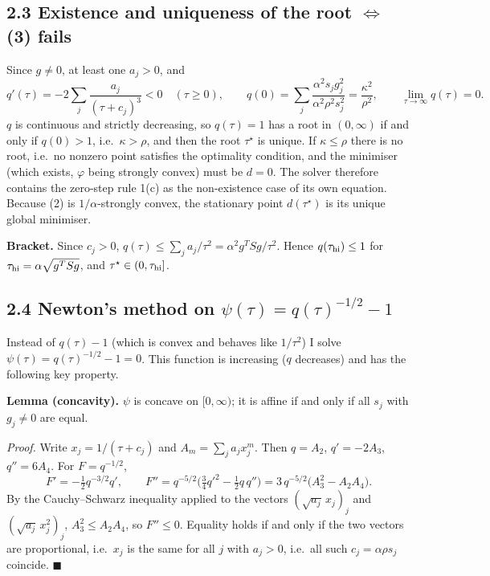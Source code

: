 \documentclass[11pt,a4paper]{article}
\begin{document}
\subsection*{2.3 Existence and uniqueness of the root $\Longleftrightarrow$ (3) fails}

Since $g\ne0$, at least one $a_j>0$, and
\begin{equation*}
q'(\tau)=-2\sum_j\frac{a_j}{(\tau+c_j)^3}<0\quad(\tau\ge0),\qquad
q(0)=\sum_j\frac{\alpha^2s_jg_j^2}{\alpha^2\rho^2s_j^2}=\frac{\kappa^2}{\rho^2},\qquad
\lim_{\tau\to\infty}q(\tau)=0 .
\end{equation*}
$q$ is continuous and strictly decreasing, so $q(\tau)=1$ has a root in $(0,\infty)$
if and only if $q(0)>1$, i.e.\ $\kappa>\rho$, and then the root $\tau^\star$ is
unique. If $\kappa\le\rho$ there is no root, i.e.\ no nonzero point satisfies the
optimality condition, and the minimiser (which exists, $\varphi$ being strongly convex)
must be $d=0$. The solver therefore contains the zero-step rule 1(c) as the
non-existence case of its own equation. Because (2) is $1/\alpha$-strongly convex,
the stationary point $d(\tau^\star)$ is its unique global minimiser.

\textbf{Bracket.} Since $c_j>0$, $q(\tau)\le\sum_ja_j/\tau^2=\alpha^2g^TSg/\tau^2$.
Hence $q(\tau_{\rm hi})\le1$ for $\tau_{\rm hi}=\alpha\sqrt{g^TSg}$, and
$\tau^\star\in(0,\tau_{\rm hi}]$.

\subsection*{2.4 Newton's method on $\psi(\tau)=q(\tau)^{-1/2}-1$}

Instead of $q(\tau)-1$ (which is convex and behaves like $1/\tau^2$) I solve
$\psi(\tau)=q(\tau)^{-1/2}-1=0$. This function is increasing ($q$ decreases) and has
the following key property.

\textbf{Lemma (concavity).} $\psi$ is concave on $[0,\infty)$; it is affine if and
only if all $s_j$ with $g_j\ne0$ are equal.

\emph{Proof.} Write $x_j=1/(\tau+c_j)$ and $A_m=\sum_ja_jx_j^m$. Then
$q=A_2$, $q'=-2A_3$, $q''=6A_4$. For $F=q^{-1/2}$,
\begin{equation*}
F'=-\tfrac12q^{-3/2}q',\qquad
F''=q^{-5/2}\Big(\tfrac34q'^2-\tfrac12q\,q''\Big)=3\,q^{-5/2}\big(A_3^2-A_2A_4\big).
\end{equation*}
By the Cauchy--Schwarz inequality applied to the vectors $(\sqrt{a_j}\,x_j)_j$ and
$(\sqrt{a_j}\,x_j^2)_j$, $A_3^2\le A_2A_4$, so $F''\le0$. Equality holds if and only
if the two vectors are proportional, i.e.\ $x_j$ is the same for all $j$ with
$a_j>0$, i.e.\ all such $c_j=\alpha\rho s_j$ coincide. \hfill$\blacksquare$
\end{document}
